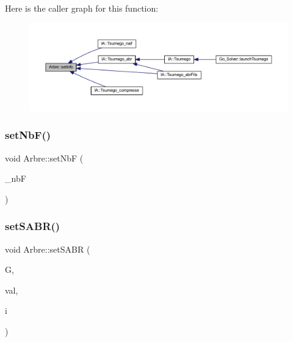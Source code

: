 Here is the caller graph for this function\+:
\nopagebreak
\begin{figure}[H]
\begin{center}
\leavevmode
\includegraphics[width=350pt]{class_arbre_a051e5328c63ba7ab6f6359f9f2f77105_icgraph}
\end{center}
\end{figure}
\mbox{\label{class_arbre_acabc45692262e5ca9c2f7b410ddcd373}} 
\subsubsection{\texorpdfstring{set\+Nb\+F()}{setNbF()}}
{\footnotesize\ttfamily void Arbre\+::set\+NbF (\begin{DoxyParamCaption}\item[{size\+\_\+t}]{\+\_\+nbF }\end{DoxyParamCaption})}

\mbox{\label{class_arbre_a08c9dd0d84f493d89cb8e2e4bd740a8b}} 
\subsubsection{\texorpdfstring{set\+S\+A\+B\+R()}{setSABR()}}
{\footnotesize\ttfamily void Arbre\+::set\+S\+A\+BR (\begin{DoxyParamCaption}\item[{\hyperlink{class_goban}{Goban} \&}]{G,  }\item[{\hyperlink{class_etat_af3ddb2296ffc379b7f3ad2bf832f294e}{Etat\+::\+V\+AL}}]{val,  }\item[{size\+\_\+t}]{i }\end{DoxyParamCaption})}

